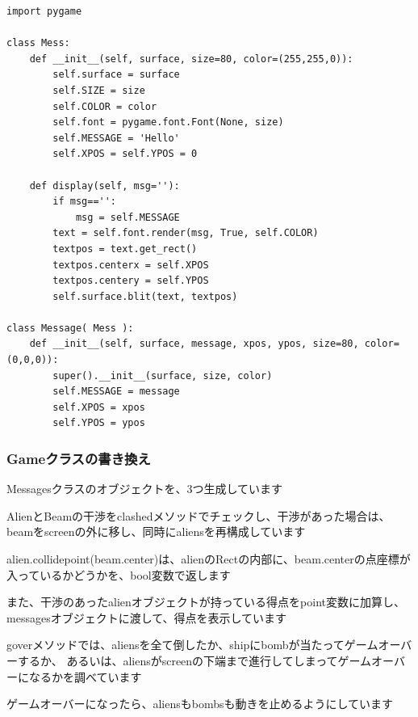 \documentclass[uplatex,a4paper,11pt,oneside,openany]{jsbook}
\begin{document}
\begin{lstlisting}[caption=Class Messages,label=p008]
import pygame

class Mess:
    def __init__(self, surface, size=80, color=(255,255,0)):
        self.surface = surface
        self.SIZE = size
        self.COLOR = color
        self.font = pygame.font.Font(None, size)
        self.MESSAGE = 'Hello'
        self.XPOS = self.YPOS = 0

    def display(self, msg=''):
        if msg=='':
            msg = self.MESSAGE
        text = self.font.render(msg, True, self.COLOR)
        textpos = text.get_rect()
        textpos.centerx = self.XPOS
        textpos.centery = self.YPOS
        self.surface.blit(text, textpos)

class Message( Mess ):
    def __init__(self, surface, message, xpos, ypos, size=80, color=(0,0,0)):
        super().__init__(surface, size, color)
        self.MESSAGE = message
        self.XPOS = xpos
        self.YPOS = ypos
\end{lstlisting}

\subsubsection{Gameクラスの書き換え}

Messagesクラスのオブジェクトを、3つ生成しています

AlienとBeamの干渉をclashedメソッドでチェックし、干渉があった場合は、beamをscreenの外に移し、同時にaliensを再構成しています

alien.collidepoint(beam.center)は、alienのRectの内部に、beam.centerの点座標が入っているかどうかを、bool変数で返します

また、干渉のあったalienオブジェクトが持っている得点をpoint変数に加算し、messagesオブジェクトに渡して、得点を表示しています

goverメソッドでは、aliensを全て倒したか、shipにbombが当たってゲームオーバーするか、
あるいは、aliensがscreenの下端まで進行してしまってゲームオーバーになるかを調べています

ゲームオーバーになったら、aliensもbombsも動きを止めるようにしています
\end{document}
